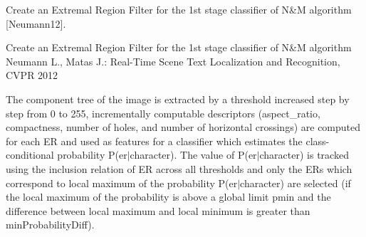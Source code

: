 Create an Extremal Region Filter for the 1st stage classifier of N\&M algorithm \mbox{[}Neumann12\mbox{]}. 

Create an Extremal Region Filter for the 1st stage classifier of N\&M algorithm Neumann L., Matas J.\+: Real-\/\+Time Scene Text Localization and Recognition, C\+V\+PR 2012 

The component tree of the image is extracted by a threshold increased step by step from 0 to 255, incrementally computable descriptors (aspect\+\_\+ratio, compactness, number of holes, and number of horizontal crossings) are computed for each ER and used as features for a classifier which estimates the class-\/conditional probability P(er$\vert$character). The value of P(er$\vert$character) is tracked using the inclusion relation of ER across all thresholds and only the E\+Rs which correspond to local maximum of the probability P(er$\vert$character) are selected (if the local maximum of the probability is above a global limit pmin and the difference between local maximum and local minimum is greater than min\+Probability\+Diff). 


